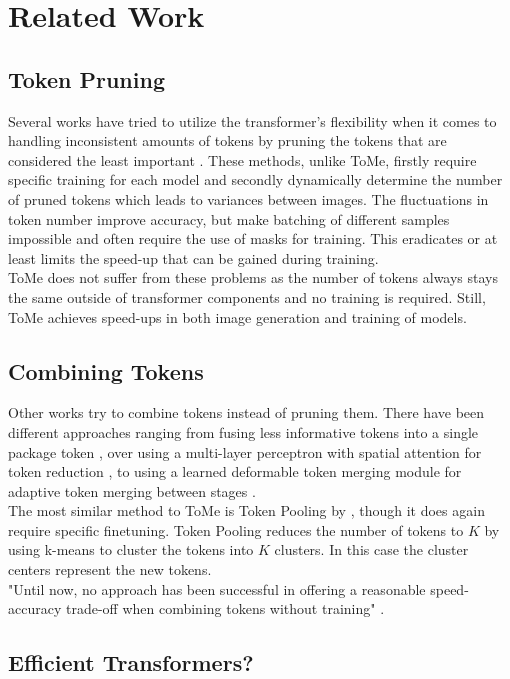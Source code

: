 \section{Related Work}


\subsection*{Token Pruning}
Several works have tried to utilize the transformer's flexibility when it comes to handling inconsistent amounts of tokens by pruning the tokens that are considered the least important \cite{meng2022adavit,yin2022vit}. These methods, unlike ToMe, firstly require specific training for each model and secondly dynamically determine the number of pruned tokens which leads to variances between images. The fluctuations in token number improve accuracy, but make batching of different samples impossible and often require the use of masks for training. This eradicates or at least limits the speed-up that can be gained during training.\\
ToMe does not suffer from these problems as the number of tokens always stays the same outside of transformer components and no training is required. Still, ToMe achieves speed-ups in both image generation and training of models.



\subsection*{Combining Tokens}
Other works try to combine tokens instead of pruning them.
There have been different approaches ranging from fusing less informative tokens into a single package token \cite{kong2021spvit, liang2022not}, over using a multi-layer perceptron with spatial attention for token reduction \cite{ryoo2021tokenlearner}, to using a learned deformable token merging module for adaptive token merging between stages \cite{pan2022less}.\\
The most similar method to ToMe is Token Pooling by \cite{marin2021token}, though it does again require specific finetuning. Token Pooling reduces the number of tokens to \(K\) by using k-means to cluster the tokens into \(K\) clusters. In this case the cluster centers represent the new tokens.\\
"Until now, no approach has been successful in offering a reasonable speed-accuracy trade-off when combining tokens without training" \cite{bolya2023tome}.



\subsection*{Efficient Transformers?}